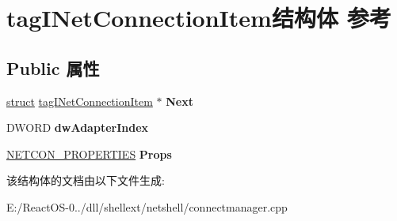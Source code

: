 \hypertarget{structtag_i_net_connection_item}{}\section{tag\+I\+Net\+Connection\+Item结构体 参考}
\label{structtag_i_net_connection_item}
\subsection*{Public 属性}
\begin{DoxyCompactItemize}
\item 
\mbox{\label{structtag_i_net_connection_item_a656061b401b1309c18ec63b9d1a763c2}} 
\hyperlink{interfacestruct}{struct} \hyperlink{structtag_i_net_connection_item}{tag\+I\+Net\+Connection\+Item} $\ast$ {\bfseries Next}
\item 
\mbox{\label{structtag_i_net_connection_item_ac7fd03574598327eac6310d43d2e863e}} 
D\+W\+O\+RD {\bfseries dw\+Adapter\+Index}
\item 
\mbox{\label{structtag_i_net_connection_item_aa2119efef05d817ed6c4e0672fc3611d}} 
\hyperlink{structtag_n_e_t_c_o_n___p_r_o_p_e_r_t_i_e_s}{N\+E\+T\+C\+O\+N\+\_\+\+P\+R\+O\+P\+E\+R\+T\+I\+ES} {\bfseries Props}
\end{DoxyCompactItemize}


该结构体的文档由以下文件生成\+:\begin{DoxyCompactItemize}
\item 
E\+:/\+React\+O\+S-\/0../dll/shellext/netshell/connectmanager.\+cpp\end{DoxyCompactItemize}
